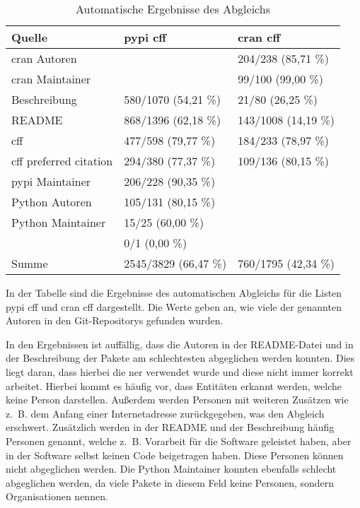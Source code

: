 \begin{table}
    \begin{tabularx}{\textwidth}{XR{3.8cm}R{3.8cm}}
        \toprule
        \textbf{Quelle}              & \textbf{\gls{pypi} \gls{cff}} & \textbf{\gls{cran} \gls{cff}} \\ \midrule
        \gls{cran} Autoren           &                               & 204/238 (85,71 \%)            \\
        \gls{cran} Maintainer        &                               & 99/100 (99,00 \%)             \\
        Beschreibung                 & 580/1070 (54,21 \%)           & 21/80 (26,25 \%)              \\
        README                       & 868/1396 (62,18 \%)           & 143/1008 (14,19 \%)           \\
        \gls{cff}                    & 477/598 (79,77 \%)            & 184/233 (78,97 \%)            \\
        \gls{cff} preferred citation & 294/380 (77,37 \%)            & 109/136 (80,15 \%)            \\
        \gls{pypi} Maintainer        & 206/228 (90,35 \%)            &                               \\
        Python Autoren               & 105/131 (80,15 \%)            &                               \\
        Python Maintainer            & 15/25 (60,00 \%)              &                               \\
                      & 0/1 (0,00 \%)                 &                               \\ \midrule
        Summe                        & 2545/3829 (66,47 \%)          & 760/1795 (42,34 \%)           \\
        \bottomrule
    \end{tabularx}
    \caption{Automatische Ergebnisse des Abgleichs}
    \label{tab:matching_results_auto}
    \small
    In der Tabelle sind die Ergebnisse des automatischen Abgleichs für die Listen \gls{pypi} \gls{cff} und \gls{cran} \gls{cff} dargestellt. Die Werte geben an, wie viele der genannten Autoren in den Git-Repositorys gefunden wurden.
\end{table}

In den Ergebnissen ist auffällig, dass die Autoren in der README-Datei und in der Beschreibung der Pakete am schlechtesten abgeglichen werden konnten.
Dies liegt daran, dass hierbei die \gls{ner} verwendet wurde und diese nicht immer korrekt arbeitet.
Hierbei kommt es häufig vor, dass Entitäten erkannt werden, welche keine Person darstellen.
Außerdem werden Personen mit weiteren Zusätzen wie z. B. dem Anfang einer Internetadresse zurückgegeben, was den Abgleich erschwert.
Zusätzlich werden in der README und der Beschreibung häufig Personen genannt, welche z. B. Vorarbeit für die Software geleistet haben, aber in der Software selbst keinen Code beigetragen haben.
Diese Personen können nicht abgeglichen werden.
Die Python Maintainer konnten ebenfalls schlecht abgeglichen werden, da viele Pakete in diesem Feld keine Personen, sondern Organisationen nennen.

